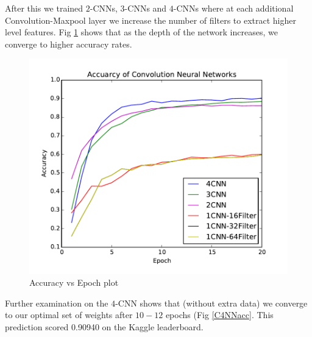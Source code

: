 \documentclass[conference]{IEEEtran}
\begin{document}
After this we trained $2$-CNNs, $3$-CNNs and $4$-CNNs where at each additional Convolution-Maxpool layer we increase the number of filters to extract higher level features. Fig \ref{CNNacc} shows that as the depth of the network increases, we converge to higher accuracy rates.

\begin{figure}[h]
	\centering
	\includegraphics[scale=0.6]{CNNacc.pdf}
	\caption{Accuracy vs Epoch plot}
	\label{CNNacc}
\end{figure}

Further examination on the $4$-CNN shows that (without extra data) we converge to our optimal set of weights after $10-12$ epochs (Fig \ref{C4NNacc}. This prediction scored 0.90940 on the Kaggle leaderboard.
\end{document}
